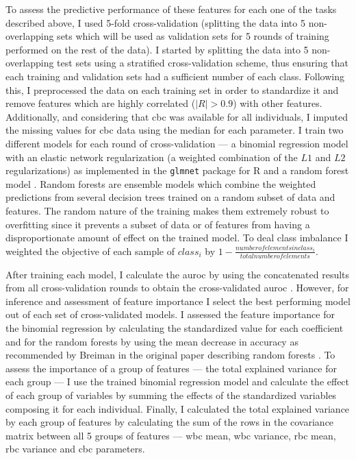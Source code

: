 To assess the predictive performance of these features for each one of the tasks described above, I used 5-fold cross-validation (splitting the data into 5 non-overlapping sets which will be used as validation sets for 5 rounds of training performed on the rest of the data). I started by splitting the data into 5 non-overlapping test sets using a stratified cross-validation scheme, thus ensuring that each training and validation sets had a sufficient number of each class. Following this, I preprocessed the data on each training set in order to standardize it and remove features which are highly correlated ($|R|>0.9$) with other features. Additionally, and considering that \ac{cbc} was available for all individuals, I imputed the missing values for \ac{cbc} data using the median for each parameter. I train two different models for each round of cross-validation --- a binomial regression model with an elastic network regularization (a weighted combination of the $L1$ and $L2$ regularizations) as implemented in the \texttt{glmnet} package for R \cite{Friedman2010-gl} and a random forest model \cite{Breiman2001-yz}. Random forests are ensemble models which combine the weighted predictions from several decision trees trained on a random subset of data and features. The random nature of the training makes them extremely robust to overfitting since it prevents a subset of data or of features from having a disproportionate amount of effect on the trained model. To deal class imbalance I weighted the objective of each sample of $class_i$ by $1-\frac{number of elements in class_i}{total number of elements}$. 

After training each model, I calculate the \ac{auroc} by using the concatenated results from all cross-validation rounds to obtain the cross-validated \ac{auroc} \cite{Fawcett2006-mo}. However, for inference and assessment of feature importance I select the best performing model out of each set of cross-validated models. I assessed the feature importance for the binomial regression by calculating the standardized value for each coefficient and for the random forests by using the mean decrease in accuracy as recommended by Breiman in the original paper describing random forests \cite{Breiman2001-yz}. To assess the importance of a group of features --- the total explained variance for each group --- I use the trained binomial regression model and calculate the effect of each group of variables by summing the effects of the standardized variables composing it for each individual. Finally, I calculated the total explained variance by each group of features by calculating the sum of the rows in the covariance matrix between all 5 groups of features --- \ac{wbc} mean, \ac{wbc} variance, \ac{rbc} mean, \ac{rbc} variance and \ac{cbc} parameters.


